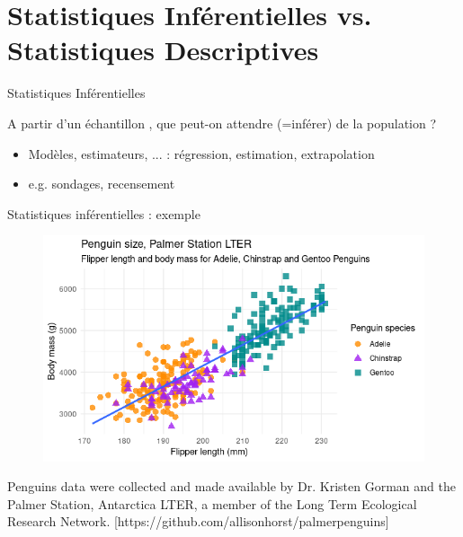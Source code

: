 \documentclass{beamer}
\begin{document}
\section{Statistiques Inférentielles vs. Statistiques Descriptives}


\begin{frame}{ Statistiques Inférentielles}  




  A partir d'un échantillon , que peut-on attendre (=\alert{inférer}) de la population ?
\begin{itemize}
  \item Modèles, estimateurs, ... : \alert{régression}, \alert{estimation}, \alert{extrapolation}
  \item e.g. sondages, recensement 
\end{itemize}

\end{frame}  
  
\begin{frame}{Statistiques inférentielles : exemple}
  


\begin{figure}
  \centering
     \includegraphics[width=.7\linewidth]{img/penguins_reglin.png}
\end{figure}

  
\begin{small}
\begin{spacing}{0.75}
Penguins data were collected and made available by Dr. Kristen Gorman and the Palmer Station, Antarctica LTER, a member of the Long Term Ecological Research Network.
[https://github.com/allisonhorst/palmerpenguins]
\end{spacing}
\end{small}
\end{frame}
\end{document}

